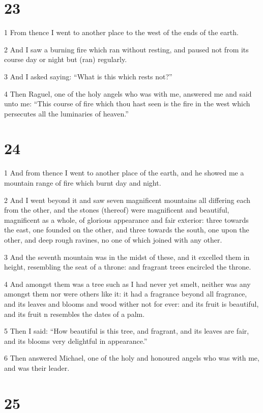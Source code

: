 \chapter{23}

\par 1 From thence I went to another place to the west of the ends of the earth.
\par 2 And I saw a burning fire which ran without resting, and paused not from its course day or night but (ran) regularly.
\par 3 And I asked saying: “What is this which rests not?”
\par 4 Then Raguel, one of the holy angels who was with me, answered me and said unto me: “This course of fire which thou hast seen is the fire in the west which persecutes all the luminaries of heaven.”

\chapter{24}

\par 1 And from thence I went to another place of the earth, and he showed me a mountain range of fire which burnt day and night.
\par 2 And I went beyond it and saw seven magnificent mountains all differing each from the other, and the stones (thereof) were magnificent and beautiful, magnificent as a whole, of glorious appearance and fair exterior: three towards the east, one founded on the other, and three towards the south, one upon the other, and deep rough ravines, no one of which joined with any other.
\par 3 And the seventh mountain was in the midst of these, and it excelled them in height, resembling the seat of a throne: and fragrant trees encircled the throne.
\par 4 And amongst them was a tree such as I had never yet smelt, neither was any amongst them nor were others like it: it had a fragrance beyond all fragrance, and its leaves and blooms and wood wither not for ever: and its fruit is beautiful, and its fruit n resembles the dates of a palm.
\par 5 Then I said: “How beautiful is this tree, and fragrant, and its leaves are fair, and its blooms very delightful in appearance.”
\par 6 Then answered Michael, one of the holy and honoured angels who was with me, and was their leader.

\chapter{25}

